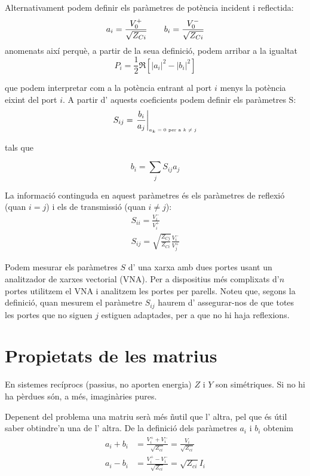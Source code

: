 Alternativament podem definir els paràmetres de potència incident i reflectida:
\begin{equation}
  a_i = \frac{V_0 ^+}{\sqrt{Z_{Ci}}} \qquad b_i = \frac{V_0 ^-}{\sqrt{Z_{Ci}}}
\end{equation}
anomenats així perquè, a partir de la seua definició, podem arribar a la igualtat
\begin{equation}
  P_i = \frac{1}{2} \Re \left [ \left \vert a_i \right \vert ^2 - \left \vert b_i \right \vert ^2 \right ]
\end{equation}

que podem interpretar com a la potència entrant al port $i$ menys la potència eixint del port $i$. A partir d' aquests coeficients podem definir els  paràmetres S:
\begin{equation}
  S_{ij} = \left . \frac{b_i}{a_j} \right \vert _{\text{\tiny $a_k = 0$ per a $k \neq j$}}
\end{equation}

tals que
  
\begin{equation}
  b_i = \sum_j S_{ij} a_j
\end{equation}

La informació continguda en aquest paràmetres és els paràmetres de reflexió (quan $i = j$) i els de transmissió (quan $i \neq j$):
\begin{align}
  S_{ii} = \frac{V_i ^-}{V_i^+} \\
  S_{ij} =  \sqrt{\frac{Z_{Cj}}{Z_{Ci}}}  \frac{V_i ^-}{V_j ^+}
\end{align}

Podem mesurar els paràmetres $S$ d' una xarxa amb dues portes usant un analitzador de xarxes vectorial (VNA). Per a dispositius més complixats d'$n$ portes utilitzem el VNA i analitzem les portes per parells. Noteu que, segons la definició, quan mesurem el paràmetre $S_{ij}$ haurem d' assegurar-nos de que totes les portes que no siguen $j$ estiguen adaptades, per a que no hi haja reflexions.

\section{Propietats de les matrius}

En sistemes recíprocs (passius, no aporten energia) $Z$ i $Y$ son simétriques. Si no hi ha pèrdues són, a més, imaginàries pures.

Depenent del problema una matriu serà més ñutil que l' altra, pel que és útil saber obtindre'n una de l' altra. De la definició dels paràmetres $a_i$ i $b_i$ obtenim
\begin{align}
  a_i + b_i &= \frac{V_i ^+ + V_i ^-}{\sqrt{Z_{ci}}} = \frac{V_i}{\sqrt{Z_{ci}}} \\
  a_i - b_i &= \frac{V_i ^+ - V_i ^-}{\sqrt{Z_{ci}}} = \sqrt{Z_{ci}} I_i
\end{align}

